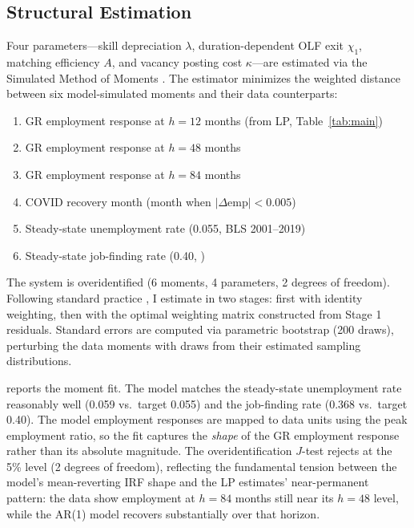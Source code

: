 \documentclass[12pt]{article}
\begin{document}
\subsection{Structural Estimation}
\label{sec:structural_estimation}

Four parameters---skill depreciation $\lambda$, duration-dependent OLF exit $\chi_1$, matching efficiency $A$, and vacancy posting cost $\kappa$---are estimated via the Simulated Method of Moments \citep[SMM;][]{mcfadden1989method,pakes1989simulation}. The estimator minimizes the weighted distance between six model-simulated moments and their data counterparts:

\begin{enumerate}
\item GR employment response at $h = 12$ months (from LP, Table~\ref{tab:main})
\item GR employment response at $h = 48$ months
\item GR employment response at $h = 84$ months
\item COVID recovery month (month when $|\Delta \text{emp}| < 0.005$)
\item Steady-state unemployment rate (0.055, BLS 2001--2019)
\item Steady-state job-finding rate (0.40, \citealt{shimer2005cyclical})
\end{enumerate}

The system is overidentified (6 moments, 4 parameters, 2 degrees of freedom). Following standard practice \citep{hansen1982large,duffie1993simulated}, I estimate in two stages: first with identity weighting, then with the optimal weighting matrix constructed from Stage 1 residuals. Standard errors are computed via parametric bootstrap (200 draws), perturbing the data moments with draws from their estimated sampling distributions.



 reports the moment fit. The model matches the steady-state unemployment rate reasonably well (0.059 vs.\ target 0.055) and the job-finding rate (0.368 vs.\ target 0.40). The model employment responses are mapped to data units using the peak employment ratio, so the fit captures the \textit{shape} of the GR employment response rather than its absolute magnitude. The overidentification $J$-test rejects at the 5\% level (2 degrees of freedom), reflecting the fundamental tension between the model's mean-reverting IRF shape and the LP estimates' near-permanent pattern: the data show employment at $h=84$ months still near its $h=48$ level, while the AR(1) model recovers substantially over that horizon.
\end{document}
